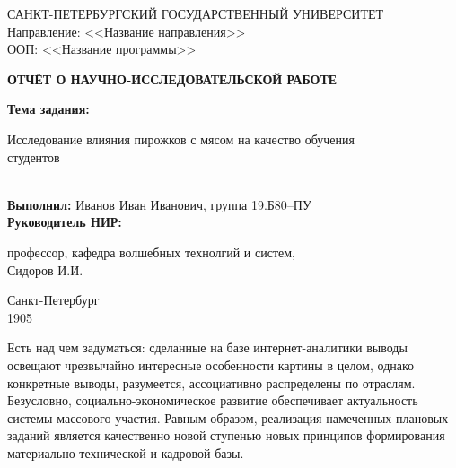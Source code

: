 \documentclass[a4paper, 12pt]{article}
\begin{document}
\begin{titlepage}
    \begin{center}
        САНКТ-ПЕТЕРБУРГСКИЙ ГОСУДАРСТВЕННЫЙ УНИВЕРСИТЕТ \\
        Направление: <<Название направления>> \\ 
        ООП: <<Название программы>> 

        \vspace{6cm}
        {\bfseries ОТЧЁТ О НАУЧНО-ИССЛЕДОВАТЕЛЬСКОЙ РАБОТЕ} 
        \vspace{\baselineskip}
        \begin{flushleft}
            {\bfseries Тема задания:} 
                \begin{minipage}[t]{0.8\textwidth}
                    Исследование влияния пирожков с мясом на качество обучения\\ студентов
                \end{minipage}\\
            \vspace{\baselineskip}
            {\bfseries Выполнил:} Иванов Иван Иванович, группа 19.Б80--ПУ \\
            \vspace{\baselineskip}
            {\bfseries Руководитель НИР:} 
                \begin{minipage}[t]{0.7\textwidth}
                    профессор, кафедра волшебных технолгий и систем,\\  Сидоров И.\:И.
                \end{minipage}
        \end{flushleft}

        \vspace{\fill}
        Санкт-Петербург \\
        1905
    \end{center}
\end{titlepage}
\addtocounter{page}{1}

\newpage
\tableofcontents

\newpage
{}
Есть над чем задуматься: сделанные на базе интернет-аналитики выводы освещают чрезвычайно интересные особенности картины в целом, однако конкретные выводы, 
разумеется, ассоциативно распределены по отраслям. Безусловно, социально-экономическое развитие обеспечивает актуальность системы массового участия. 
Равным образом, реализация намеченных плановых заданий является качественно новой ступенью новых принципов формирования материально-технической и кадровой базы.
\end{document}
